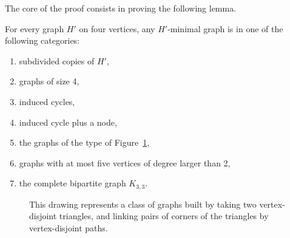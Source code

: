 \documentclass[a4paper,thm-restate,USenglish]{lipics-v2019}
\begin{document}
The core of the proof consists in proving the following lemma. 

\begin{lemma}
\label{lem:H'-minimal}
For every graph $H'$ on four vertices, any $H'$-minimal graph is in one of the following categories:
\begin{enumerate}
    \item \label{item:sub-copies} subdivided copies of $H'$,
    \item \label{item:size-4} graphs of size 4,
    \item \label{item:ind-cycles} induced cycles,
    \item \label{item:ind-cycles-plus-1} induced cycle plus a node,
    \item \label{item:figure} the graphs of the type of Figure~\ref{fig:k4+K1},
    \item \label{item:at-most-5} graphs with at most five vertices of degree larger than 2,
    \item \label{item:last_case2} the complete bipartite graph $K_{3,3}$.%
\end{enumerate} 
\end{lemma}

\begin{figure}[!ht]
\centering
{}
\caption{This drawing represents a class of graphs built by taking two vertex-disjoint triangles, and linking pairs of corners of the triangles by vertex-disjoint paths.}
\label{fig:k4+K1}
\end{figure}
\end{document}
